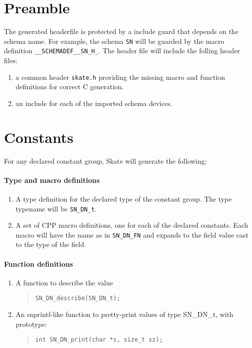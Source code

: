 \documentclass[a4paper,11pt,twoside]{report}
\begin{document}
{{\section{Preamble}

The generated headerfile is protected by a include guard that depends on the
schema name. For example, the schema \texttt{SN} will be guarded by the
macro definition \texttt{\_\_SCHEMADEF\_\_SN\_H\_}. The header file will 
include the folling header files:
\begin{enumerate}
  \item a common header \texttt{skate.h} providing the missing macro and 
        function definitions for correct C generation.
  \item an include for each of the imported schema devices.
\end{enumerate}

\section{Constants}

For any declared constant group, Skate will generate the following:

\paragraph{Type and macro definitions}
\begin{enumerate}
  \item A type definition for the declared type of the constant group. The 
        type  typename will be \texttt{SN\_DN\_t}.
  \item A set of CPP macro definitions, one for each of the declared constants.
        Each macro will have the name as in \texttt{SN\_DN\_FN} and expands to the field value cast to the type of the field.
\end{enumerate}

\paragraph{Function definitions}
\begin{enumerate}
  \item A function to describe the value 
        \begin{quote}
          \texttt{SN\_DN\_describe(SN\_DN\_t);}
        \end{quote}

  \item An snprintf-like function to pretty-print values of type SN\_DN\_t, 
        with prototype:
        \begin{quote}
          \texttt{int SN\_DN\_print(char *s, size\_t sz);}
        \end{quote}


\end{enumerate}}}
\end{document}
